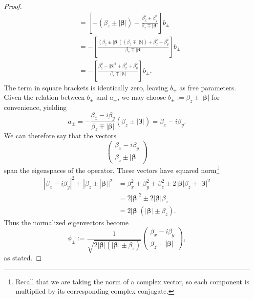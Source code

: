 \documentclass[12pt]{article}
\begin{document}
\begin{proof}
\begin{displaymath}
\begin{split}
      &= \left[ -(\beta_z \pm |\bm{\beta}|) - \frac{\beta_x^2 + \beta_y^2}{\beta_z \mp |\bm{\beta}|} \right] b_{\pm} \\
      &= - \left[ \frac{(\beta_z \pm |\bm{\beta}|)(\beta_z \mp |\bm{\beta}|) + \beta_x^2 + \beta_y^2}{\beta_z \mp |\bm{\beta}|} \right] b_{\pm} \\
      &= - \left[ \frac{\beta_z^2 - |\bm{\beta}|^2 + \beta_x^2 + \beta_y^2}{\beta_z \mp |\bm{\beta}|} \right] b_{\pm}.
    \end{split}
  \end{displaymath}
  The term in square brackets is identically zero, leaving $b_{\pm}$ as free parameters. Given the relation between $b_{\pm}$ and $a_{\pm}$, we may choose $b_{\pm} := \beta_z \pm |\bm{\beta}|$ for convenience, yielding
  \begin{displaymath}
    a_{\pm} = - \frac{\beta_x - i \beta_y}{\beta_z \mp |\bm{\beta}|} (\beta_z \pm |\bm{\beta}|)
    = \beta_x - i \beta_y.
  \end{displaymath}
  We can therefore say that the vectors
  \begin{displaymath}
    \begin{pmatrix}
      \beta_x - i \beta_y \\
      \beta_z \pm |\bm{\beta}|
    \end{pmatrix}
  \end{displaymath}
  span the eigenspaces of the operator. These vectors have squared norm\footnote{Recall that we are taking the norm of a complex vector, so each component is multiplied by its corresponding complex conjugate.}
  \begin{displaymath}
    \begin{split}
      |\beta_x - i \beta_y|^2 + |\beta_z \pm |\bm{\beta}||^2
      &= \beta_x^2 + \beta_y^2 + \beta_z^2 \pm 2|\bm{\beta}| \beta_z + |\bm{\beta}|^2 \\
      &= 2 |\bm{\beta}|^2 \pm 2 |\bm{\beta}| \beta_z \\
      &= 2 |\bm{\beta}| \left( |\bm{\beta}| \pm \beta_z \right).
    \end{split}
  \end{displaymath}
  Thus the normalized eigenvectors become
  \begin{displaymath}
    \phi_{\pm}
    := \frac{1}{\sqrt{2|\bm{\beta}| (|\bm{\beta}| \pm \beta_z)}}
    \begin{pmatrix}
      \beta_x - i \beta_y \\
      \beta_z \pm |\bm{\beta}|
    \end{pmatrix},
  \end{displaymath}
  as stated.
\end{proof}
\end{document}
